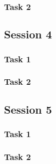\documentclass[12pt]{article}
\begin{document}
\subsubsection{Task 2}

\subsection{Session 4}

\subsubsection{Task 1}

\subsubsection{Task 2}

\subsection{Session 5}

\subsubsection{Task 1}

\subsubsection{Task 2}
\end{document}
